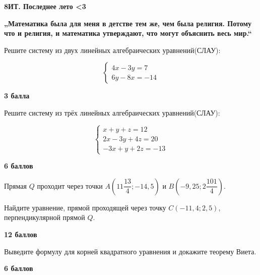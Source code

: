 \centerline{\bf \Huge 8ИТ. Последнее лето <3}
\centerline{\bf \Huge }

\begin{flushright}
        \scriptsize{\textbf{„Математика была для меня в детстве тем же, чем была религия. Потому что и религия, и математика утверждают, что могут объяснить весь мир.“ }}
\end{flushright}

 Решите систему из двух линейных алгебраических уравнений(СЛАУ):

\begin{equation*}
 \begin{cases}
   4x - 3y = 7
   \\
   6y - 8x = -14
 \end{cases}
\end{equation*}


\begin{flushright} \textbf{3 балла}\\ 
\end{flushright}

 Решите систему из трёх линейных алгебраических уравнений(СЛАУ):

\begin{equation*}
 \begin{cases}
   x + y + z = 12
   \\
   2x - 3y + 4z = 20
   \\
   -3x + y + 2z = -13
   
 \end{cases}
\end{equation*}


\begin{flushright} \textbf{6 баллов}\\ 
\end{flushright}

 Прямая $Q$ проходит через точки $A(11\dfrac{13}{4};-14,5)$ и $B(-9,25;2\dfrac{101}{4})$.

Найдите уравнение, прямой проходящей через точку $C(-11,4;2,5)$, перпендикулярной прямой $Q$.


\begin{flushright} \textbf{12 баллов}\\ 
\end{flushright}

 Выведите формулу для корней квадратного уравнения и докажите теорему Виета.

\begin{flushright} \textbf{6 баллов}\\ 
\end{flushright}

